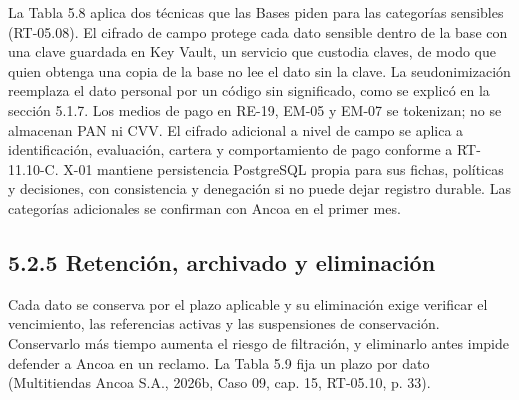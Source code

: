 \documentclass[11pt]{article}
\begin{document}
La Tabla 5.8 aplica dos técnicas que las Bases piden para las categorías sensibles (RT-05.08). El cifrado de campo protege cada dato sensible dentro de la base con una clave guardada en Key Vault, un servicio que custodia claves, de modo que quien obtenga una copia de la base no lee el dato sin la clave. La seudonimización reemplaza el dato personal por un código sin significado, como se explicó en la sección 5.1.7. Los medios de pago en RE-19, EM-05 y EM-07 se tokenizan; no se almacenan PAN ni CVV. El cifrado adicional a nivel de campo se aplica a identificación, evaluación, cartera y comportamiento de pago conforme a RT-11.10-C. X-01 mantiene persistencia PostgreSQL propia para sus fichas, políticas y decisiones, con consistencia y denegación si no puede dejar registro durable. Las categorías adicionales se confirman con Ancoa en el primer mes.

\subsection{5.2.5 Retención, archivado y eliminación}

Cada dato se conserva por el plazo aplicable y su eliminación exige verificar el vencimiento, las referencias activas y las suspensiones de conservación. Conservarlo más tiempo aumenta el riesgo de filtración, y eliminarlo antes impide defender a Ancoa en un reclamo. La Tabla 5.9 fija un plazo por dato (Multitiendas Ancoa S.A., 2026b, Caso 09, cap. 15, RT-05.10, p. 33).
\end{document}
